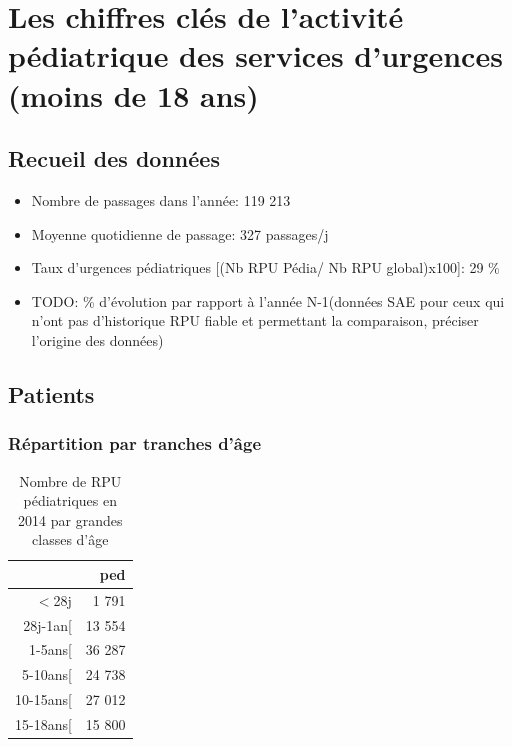 \documentclass[]{article}
\begin{document}
\section{Les chiffres clés de l'activité pédiatrique des services
d'urgences (moins de 18
ans)}\label{les-chiffres-cles-de-lactivite-pediatrique-des-services-durgences-moins-de-18-ans}

\subsection{Recueil des données}\label{recueil-des-donnees-1}

\begin{itemize}
\itemsep1pt\parskip0pt
\item
  Nombre de passages dans l'année: 119 213
\item
  Moyenne quotidienne de passage: 327 passages/j
\item
  Taux d'urgences pédiatriques {[}(Nb RPU Pédia/ Nb RPU global)x100{]}:
  29 \%
\item
  TODO: \% d'évolution par rapport à l'année N-1(données SAE pour ceux
  qui n'ont pas d'historique RPU fiable et permettant la comparaison,
  préciser l'origine des données)
\end{itemize}

\subsection{Patients}\label{patients-1}

\subsubsection{Répartition par tranches
d'âge}\label{repartition-par-tranches-dage}

\begin{table}[ht]
\centering
\begin{tabular}{rr}
  \hline
 & ped \\ 
  \hline
$<$28j & 1 791 \\ 
  28j-1an[ & 13 554 \\ 
  1-5ans[ & 36 287 \\ 
  5-10ans[ & 24 738 \\ 
  10-15ans[ & 27 012 \\ 
  15-18ans[ & 15 800 \\ 
   \hline
\end{tabular}
\caption{Nombre de RPU pédiatriques en 2014 par grandes classes d'âge} 
\end{table}
\end{document}
